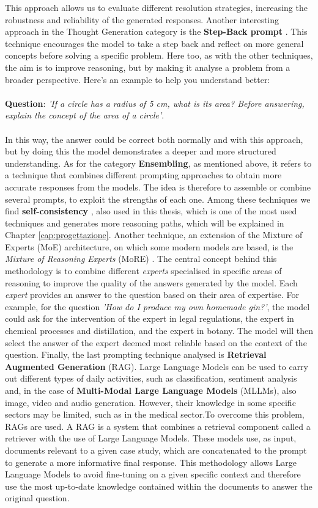 This approach allows us to evaluate different resolution strategies, increasing the robustness and reliability of the generated responses. Another interesting approach in the Thought Generation category is the \textbf{Step-Back prompt} \cite{Stepback}.
This technique encourages the model to take a step back and reflect on more general concepts before solving a specific problem. Here too, as with the other techniques, the aim is to improve reasoning, but by making it analyse a problem from a broader perspective.
Here's an example to help you understand better:\\
\\
\textbf{Question}: \textit{'If a circle has a radius of 5 cm, what is its area? Before answering, explain the concept of the area of a circle'}.\\
\\
In this way, the answer could be correct both normally and with this approach, but by doing this the model demonstrates a deeper and more structured understanding.
As for the category \textbf{Ensembling}, as mentioned above, it refers to a technique that combines different prompting approaches to obtain more accurate responses from the models. 
The idea is therefore to assemble or combine several prompts, to exploit the strengths of each one. Among these techniques we find \textbf{self-consistency} \cite{SC}, also used in this thesis, which is one of the most used techniques and generates more reasoning paths, which will be explained in Chapter \ref{cap:progettazione}.
Another technique, an extension of the Mixture of Experts (MoE) \cite{MoE} architecture, on which some modern models are based, is the \textit{Mixture of Reasoning Experts} (MoRE) \cite{MoRE}.
The central concept behind this methodology is to combine different \textit{experts} specialised in specific areas of reasoning to improve the quality of the answers generated by the model.
Each \textit{expert} provides an answer to the question based on their area of expertise.
For example, for the question \textit{'How do I produce my own homemade gin?'},  the model could ask for the intervention of the expert in legal regulations, the expert in chemical processes and distillation, and the expert in botany. The model will then select the answer of the expert deemed most reliable based on the context of the question.
Finally, the last prompting technique analysed is \textbf{Retrieval Augmented Generation }(RAG)\cite{Rag}.
Large Language Models can be used to carry out different types of daily activities, such as classification, sentiment analysis and, in the case of \textbf{Multi-Modal Large Language Models} (MLLMs)\cite{Yin_2024}, also image, video and audio generation. However, their knowledge in some specific sectors may be limited, such as in the medical sector.To overcome this problem, RAGs are used. A RAG is a system that combines a retrieval component called a retriever with the use of Large Language Models. These models use, as input, documents relevant to a given case study, which are concatenated to the prompt to generate a more informative final response. This methodology allows Large Language Models to avoid fine-tuning on a given specific context and therefore use the most up-to-date knowledge contained within the documents to answer the original question.

